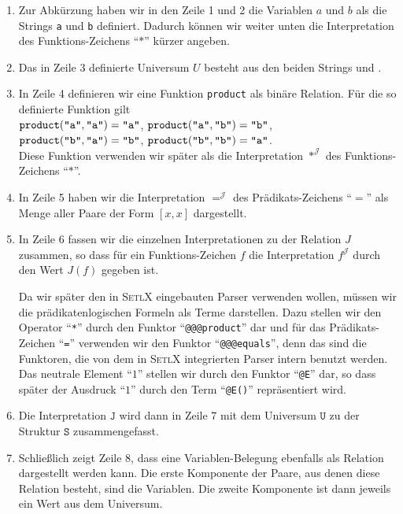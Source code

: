 \begin{enumerate}
\item Zur Abk\"{u}rzung haben wir in den Zeile 1 und 2 die Variablen $a$ und $b$
      als die Strings \texttt{a} und \texttt{b}
      definiert.  Dadurch k\"{o}nnen wir weiter unten die Interpretation des
      Funktions-Zeichens ``$*$'' k\"{u}rzer angeben.
\item Das in Zeile 3 definierte Universum $U$ besteht aus den beiden Strings  und .
\item In Zeile 4 definieren wir eine Funktion \texttt{product} als bin\"{a}re Relation.  F\"{u}r
      die so definierte Funktion gilt
      \\[0.2cm]
      \hspace*{1.3cm}
      $\mathtt{product}(\quoted{a},\quoted{a}) = \quoted{a}$, \quad
      $\mathtt{product}(\quoted{a},\quoted{b}) = \quoted{b}$, 
      \\[0.2cm]
      \hspace*{1.3cm}
      $\mathtt{product}(\quoted{b},\quoted{a}) = \quoted{b}$, \quad
      $\mathtt{product}(\quoted{b},\quoted{b}) = \quoted{a}$.
      \\[0.2cm]  
      Diese Funktion verwenden wir sp\"{a}ter als die Interpretation $*^\mathcal{J}$ des Funktions-Zeichens ``$*$''.
\item In Zeile 5 haben wir  die Interpretation $=^\mathcal{J}$ des
      Pr\"{a}dikats-Zeichens ``$=$'' als Menge aller Paare der Form $[x, x]$ dargestellt.
\item In Zeile 6 fassen wir die einzelnen Interpretationen zu der Relation $J$
      zusammen, so dass f\"{u}r ein Funktions-Zeichen $f$ die Interpretation $f^\mathcal{J}$ durch
      den Wert $J(f)$ gegeben ist. 

      Da wir sp\"{a}ter den in \textsc{SetlX} eingebauten Parser verwenden wollen, m\"ussen wir die
      pr\"adikatenlogischen Formeln als
      Terme darstellen.  Dazu stellen wir den Operator ``\texttt{*}'' durch den Funktor ``\texttt{@@@product}''
      dar und f\"ur das Pr\"{a}dikats-Zeichen ``\texttt{=}'' verwenden wir den Funktor ``\texttt{@@@equals}'',
      denn das sind die Funktoren, die von dem in \textsc{SetlX} integrierten Parser intern benutzt werden.
      Das neutrale Element ``$1$'' stellen wir durch den Funktor ``\texttt{@E}'' dar, so dass sp\"{a}ter der
      Ausdruck ``$1$'' durch den Term ``\texttt{@E()}'' repr\"{a}sentiert wird.
\item Die Interpretation $\mathtt{J}$ wird dann in Zeile 7 mit dem
      Universum $\mathtt{U}$ zu der Struktur $\mathtt{S}$ zusammengefasst.  
\item Schlie\ss{}lich zeigt Zeile 8, dass eine
      Variablen-Belegung ebenfalls als Relation dargestellt werden kann.  Die erste Komponente
      der Paare, aus denen diese Relation besteht, sind die Variablen.  Die zweite Komponente
      ist dann jeweils ein Wert aus dem Universum.
\end{enumerate}


